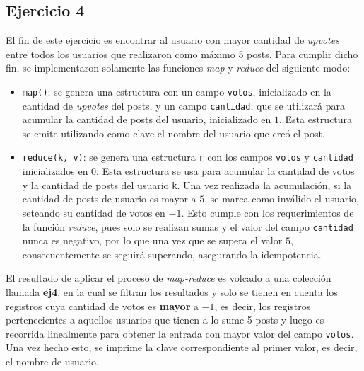 \documentclass[a4paper]{article}
\begin{document}
\subsection{Ejercicio 4}
El fin de este ejercicio es encontrar al usuario con mayor cantidad de
\textit{upvotes} entre todos los usuarios que realizaron como máximo 5 posts.
Para cumplir dicho fin, se implementaron solamente las funciones \textit{map} y
\textit{reduce} del siguiente modo:
\begin{itemize}
  \item \verb|map()|: se genera una estructura con un campo \verb|votos|,
  inicializado en la cantidad de \textit{upvotes} del posts, y un campo
  \verb|cantidad|, que se utilizará para acumular la cantidad de posts del
  usuario, inicializado en $1$. Esta estructura se emite utilizando como clave
  el nombre del usuario que creó el post.
  \item \verb|reduce(k, v)|: se genera una estructura \verb|r| con los campos
  \verb|votos| y \verb|cantidad| inicializados en $0$. Esta estructura se usa
  para acumular la cantidad de votos y la cantidad de posts del usuario
  \verb|k|. Una vez realizada la acumulación, si la cantidad de posts de
  usuario es mayor a $5$, se marca como inválido el usuario, seteando su
  cantidad de votos en $-1$. Esto cumple con los requerimientos de la función
  \textit{reduce}, pues solo se realizan sumas y el valor del campo
  \verb|cantidad| nunca es negativo, por lo que una vez que se supera el valor
  $5$, consecuentemente se seguirá superando, asegurando la idempotencia.
\end{itemize}

El resultado de aplicar el proceso de \textit{map-reduce} es volcado a una
colección llamada \textbf{ej4}, en la cual se filtran los resultados y solo se
tienen en cuenta los registros cuya cantidad de votos es \textbf{mayor} a $-1$,
es decir, los registros pertenecientes a aquellos usuarios que tienen a lo sume
5 posts y luego es recorrida linealmente para obtener la entrada con mayor
valor del campo \verb|votos|. Una vez hecho esto, se imprime la clave
correspondiente al primer valor, es decir, el nombre de usuario.
\end{document}
